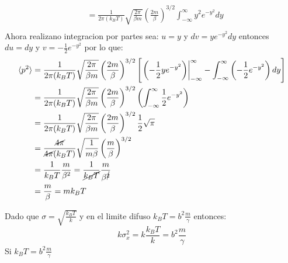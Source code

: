 \documentclass[a4paper]{article}
\begin{document}
\begin{answer}
\begin{align*}
            &= \frac{1}{2 \pi (k_B T)} \sqrt{\frac{2\pi}{\beta m}} \left(\frac{2m}{\beta}\right)^{3/2}  \int_{-\infty}^{\infty} y^2 e^{-y^2} dy \\
        \end{align*}
        Ahora realizano integracion por partes sea: $u = y$ y $dv = y e^{-y^2} dy$ entonces $du = dy$ y $v = -\frac{1}{2} e^{-y^2}$ por lo que:
        \begin{align*}
            \langle p^2 \rangle &=\frac{1}{2 \pi (k_B T)} \sqrt{\frac{2\pi}{\beta m}} \left(\frac{2m}{\beta}\right)^{3/2}  \left[
                \left.\left(-\frac{1}{2} y e^{-y^2} \right)\right|_{-\infty}^{\infty} - \int_{-\infty}^{\infty} \left(-\frac{1}{2} e^{-y^2} \right) dy
            \right]\\
            &=\frac{1}{2 \pi (k_B T)} \sqrt{\frac{2\pi}{\beta m}} \left(\frac{2m}{\beta}\right)^{3/2}  \left(\int_{-\infty}^{\infty}\frac{1}{2} e^{-y^2} \right) \\
            &=\frac{1}{2 \pi (k_B T)} \sqrt{\frac{2\pi}{\beta m}} \left(\frac{2m}{\beta}\right)^{3/2}  \frac{1}{2} \sqrt{\pi} \\
            &=\frac{\cancel{4\pi}}{\cancel{4\pi} (k_B T)} \sqrt{\frac{1}{m\beta}} \left(\frac{m}{\beta}\right)^{3/2}  \\
            &=\frac{1}{k_B T} \frac{m}{\beta^2} = \frac{1}{\cancel{k_B T}} \frac{m}{\beta^{\cancel 2}}\\
            &= \frac{m}{\beta}= m k_B T\\
        \end{align*}
    \end{answer}
    \begin{answer}
        Dado que $\sigma = \sqrt{\frac{k_B T}{k}}$ y en el limite difuso $k_B T = b^2 \frac m\gamma$ entonces:
        $$
        k\sigma^2_x = k\frac{k_B T}{k} =  b^2 \frac m\gamma 
        $$
        Si $k_BT = b^2 \frac m\gamma$
    \end{answer}
\end{document}
